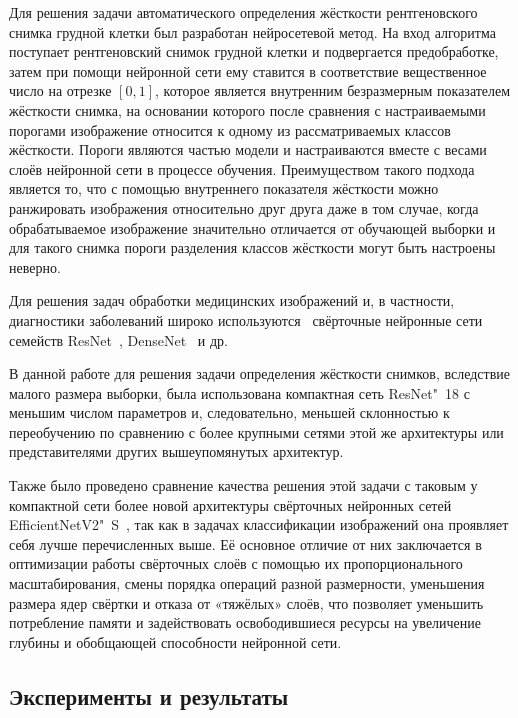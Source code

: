 Для решения задачи автоматического определения жёсткости рентгеновского снимка грудной клетки был разработан нейросетевой метод. На вход алгоритма поступает рентгеновский снимок грудной клетки и подвергается предобработке, затем при помощи нейронной сети ему ставится в соответствие вещественное число на отрезке $\left[0, 1\right]$, которое является внутренним безразмерным показателем жёсткости снимка, на основании которого после сравнения с настраиваемыми порогами изображение относится к одному из рассматриваемых классов жёсткости.  Пороги являются частью модели и настраиваются вместе с весами слоёв нейронной сети в процессе обучения. Преимуществом такого подхода является то, что с помощью внутреннего показателя жёсткости можно ранжировать изображения относительно друг друга даже в том случае, когда обрабатываемое изображение значительно отличается от обучающей выборки и для такого снимка пороги разделения классов жёсткости могут быть настроены неверно.

Для решения задач обработки медицинских изображений и, в частности, диагностики заболеваний широко используются~\cite{oloko2022systematic} свёрточные нейронные сети семейств ResNet~\cite{he2016deep}, DenseNet~\cite{huang2017densely} и др.

В данной работе для решения задачи определения жёсткости снимков, вследствие малого размера выборки, была использована компактная сеть ResNet"~18 с меньшим числом параметров и, следовательно, меньшей склонностью к переобучению по сравнению с более крупными сетями этой же архитектуры или представителями других вышеупомянутых архитектур.

Также было проведено сравнение качества решения этой задачи с таковым у компактной сети более новой архитектуры свёрточных нейронных сетей EfficientNetV2"~S~\cite{tan2021efficientnetv2}, так как в задачах классификации изображений она проявляет себя лучше перечисленных выше. Её основное отличие от них заключается в оптимизации работы свёрточных слоёв с помощью их пропорционального масштабирования, смены порядка операций разной размерности, уменьшения размера ядер свёртки и отказа от «тяжёлых» слоёв, что позволяет уменьшить потребление памяти и задействовать освободившиеся ресурсы на увеличение глубины и обобщающей способности нейронной сети.

\subsection{Эксперименты и результаты} \label{subsec:tb-hardness-experiments}

